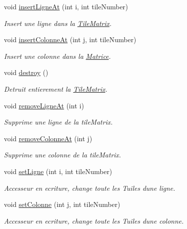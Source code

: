 \begin{DoxyCompactItemize}
void \hyperlink{class_tile_matrix_ad3dc00ccf107bf42068ed0dc2be5bc3b}{insert\+Ligne\+At} (int i, int tile\+Number)
\begin{DoxyCompactList}\small\item\em Insert une ligne dans la \hyperlink{class_tile_matrix}{Tile\+Matrix}. \end{DoxyCompactList}\item 
void \hyperlink{class_tile_matrix_a0726b04506143b1710bb87b4565d9738}{insert\+Colonne\+At} (int j, int tile\+Number)
\begin{DoxyCompactList}\small\item\em Insert une colonne dans la \hyperlink{class_matrice}{Matrice}. \end{DoxyCompactList}\item 
void \hyperlink{class_tile_matrix_ab1c633e4f9e6d6f9c3d5ffa87723ad5c}{destroy} ()
\begin{DoxyCompactList}\small\item\em Detruit entierement la \hyperlink{class_tile_matrix}{Tile\+Matrix}. \end{DoxyCompactList}\item 
void \hyperlink{class_tile_matrix_a2edc148c07d023408d1a659b8033e0f4}{remove\+Ligne\+At} (int i)
\begin{DoxyCompactList}\small\item\em Supprime une ligne de la tile\+Matrix. \end{DoxyCompactList}\item 
void \hyperlink{class_tile_matrix_a8756d0d2b534e557db1f7555f32a9ff9}{remove\+Colonne\+At} (int j)
\begin{DoxyCompactList}\small\item\em Supprime une colonne de la tile\+Matrix. \end{DoxyCompactList}\item 
void \hyperlink{class_tile_matrix_a1ff5f7a4550c1fb5214f8a2f3d585c88}{set\+Ligne} (int i, int tile\+Number)
\begin{DoxyCompactList}\small\item\em Accesseur en ecriture, change toute les Tuiles d\textquotesingle{}une ligne. \end{DoxyCompactList}\item 
void \hyperlink{class_tile_matrix_a646d11a4f74c0663bd772cf114d6fc5b}{set\+Colonne} (int j, int tile\+Number)
\begin{DoxyCompactList}\small\item\em Accesseur en ecriture, change toute les Tuiles d\textquotesingle{}une colonne. \end{DoxyCompactList}\item 

\end{DoxyCompactItemize}
